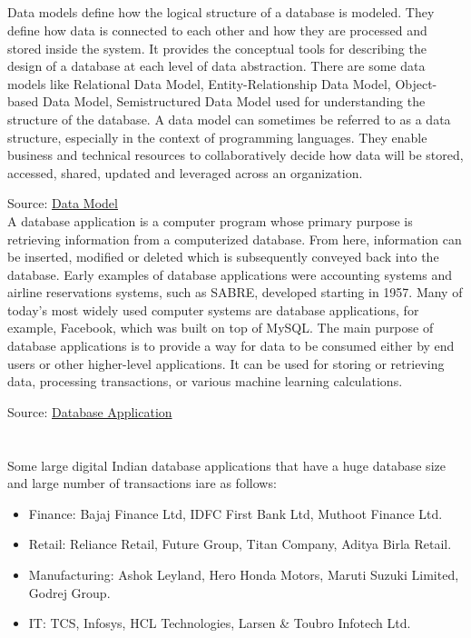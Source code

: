 \documentclass[12pt]{article}
\begin{document}
\subsection{}
Data models define how the logical structure of a database is modeled. They define how data is connected to each other and how they are processed and stored inside the system. It provides the conceptual tools for describing the design of a database at each level of data abstraction. There are some data models like Relational Data Model, Entity-Relationship Data Model, Object-based Data Model, Semistructured Data Model used for understanding the structure of the database. A data model can sometimes be referred to as a data structure, especially in the context of programming languages. They enable business and technical resources to collaboratively decide how data will be stored, accessed, shared, updated and leveraged across an organization. 

Source: \href{https://en.wikipedia.org/wiki/Data_model}{Data Model} \\

A database application is a computer program whose primary purpose is retrieving information from a computerized database. From here, information can be inserted, modified or deleted which is subsequently conveyed back into the database. Early examples of database applications were accounting systems and airline reservations systems, such as SABRE, developed starting in 1957. Many of today's most widely used computer systems are database applications, for example, Facebook, which was built on top of MySQL. The main purpose of database applications is to provide a way for data to be consumed either by end users or other higher-level applications. It can be used for storing or retrieving data, processing transactions, or various machine learning calculations.

Source: \href{https://en.wikipedia.org/wiki/Database_application}{Database Application} \\


\section{}
Some large digital Indian database applications that have a huge database size and large number of transactions iare as follows:
\begin{itemize}
    \item Finance: Bajaj Finance Ltd, IDFC First Bank Ltd, Muthoot Finance Ltd.
    \item Retail: Reliance Retail, Future Group, Titan Company, Aditya Birla Retail.
    \item Manufacturing: Ashok Leyland, Hero Honda Motors, Maruti Suzuki Limited, Godrej Group.
    \item IT: TCS, Infosys, HCL Technologies, Larsen & Toubro Infotech Ltd.
\end{itemize}
\end{document}
